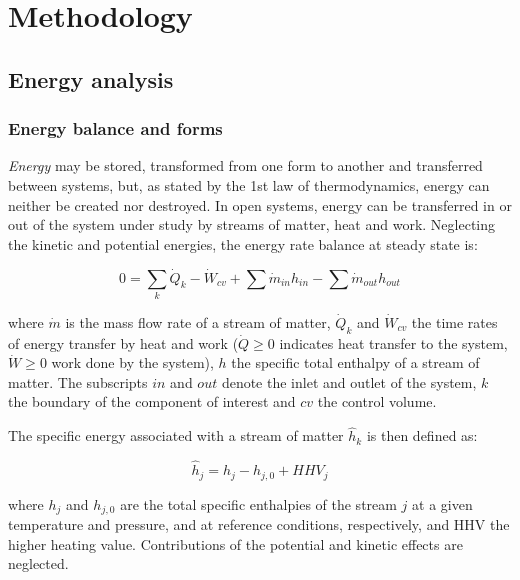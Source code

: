 \documentclass[final,times,5p]{elsarticle}
\begin{document}
\section{Methodology}
\label{sec:methods}

	\subsection{Energy analysis}
	\label{subsec:energy_analysis}

	\subsubsection{Energy balance and forms}
		
	\emph{Energy} may be stored, transformed from one form to another and transferred between systems, but, as stated by the 1st law of thermodynamics, energy can neither be created nor destroyed. In open systems, energy can be transferred in or out of the system under study by streams of matter, heat and work. Neglecting the kinetic and potential energies, the energy rate balance at steady state is:
	
	\begin{equation}
	0=\sum_k \dot{Q}_{k}-\dot{W}_{cv} + \sum \dot{m}_{in} h_{in} - \sum \dot{m}_{out} h_{out}
	\end{equation}
	
	where $\dot{m}$ is the mass flow rate of a stream of matter, $\dot{Q}_{k}$ and $\dot{W}_{cv}$ the time rates of energy transfer by heat and work ($\dot{Q}\ge0$ indicates heat transfer to the system, $\dot{W}\ge0$ work done by the system), $h$ the specific total enthalpy of a stream of matter. The subscripts $in$ and $out$ denote the inlet and outlet of the system, $k$ the boundary of the component of interest and $cv$ the control volume. 
	
	
	The specific energy associated with a stream of matter $\hat{h}_k$ is then defined as:
	
	\begin{equation}
	\hat{h}_j=h_j-h_{j,0}+HHV_j
	\end{equation}
	
	where $h_j$ and $h_{j,0}$ are the total specific enthalpies of the stream $j$ at a given temperature and pressure, and at reference conditions, respectively, and HHV the higher heating value. Contributions of the potential and kinetic effects are neglected. 
	
\end{document}

